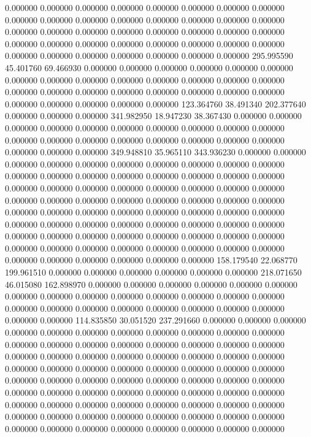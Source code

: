 0.000000 0.000000 0.000000
0.000000 0.000000 0.000000
0.000000 0.000000 0.000000
0.000000 0.000000 0.000000
0.000000 0.000000 0.000000
0.000000 0.000000 0.000000
0.000000 0.000000 0.000000
0.000000 0.000000 0.000000
0.000000 0.000000 0.000000
0.000000 0.000000 0.000000
0.000000 0.000000 0.000000
0.000000 0.000000 0.000000
0.000000 0.000000 0.000000
295.995590 45.401760 69.466930
0.000000 0.000000 0.000000
0.000000 0.000000 0.000000
0.000000 0.000000 0.000000
0.000000 0.000000 0.000000
0.000000 0.000000 0.000000
0.000000 0.000000 0.000000
0.000000 0.000000 0.000000
0.000000 0.000000 0.000000
0.000000 0.000000 0.000000
123.364760 38.491340 202.377640
0.000000 0.000000 0.000000
341.982950 18.947230 38.367430
0.000000 0.000000 0.000000
0.000000 0.000000 0.000000
0.000000 0.000000 0.000000
0.000000 0.000000 0.000000
0.000000 0.000000 0.000000
0.000000 0.000000 0.000000
0.000000 0.000000 0.000000
349.948810 35.965110 343.936230
0.000000 0.000000 0.000000
0.000000 0.000000 0.000000
0.000000 0.000000 0.000000
0.000000 0.000000 0.000000
0.000000 0.000000 0.000000
0.000000 0.000000 0.000000
0.000000 0.000000 0.000000
0.000000 0.000000 0.000000
0.000000 0.000000 0.000000
0.000000 0.000000 0.000000
0.000000 0.000000 0.000000
0.000000 0.000000 0.000000
0.000000 0.000000 0.000000
0.000000 0.000000 0.000000
0.000000 0.000000 0.000000
0.000000 0.000000 0.000000
0.000000 0.000000 0.000000
0.000000 0.000000 0.000000
0.000000 0.000000 0.000000
0.000000 0.000000 0.000000
0.000000 0.000000 0.000000
0.000000 0.000000 0.000000
0.000000 0.000000 0.000000
0.000000 0.000000 0.000000
158.179540 22.068770 199.961510
0.000000 0.000000 0.000000
0.000000 0.000000 0.000000
218.071650 46.015080 162.898970
0.000000 0.000000 0.000000
0.000000 0.000000 0.000000
0.000000 0.000000 0.000000
0.000000 0.000000 0.000000
0.000000 0.000000 0.000000
0.000000 0.000000 0.000000
0.000000 0.000000 0.000000
0.000000 0.000000 0.000000
114.835850 30.051520 237.291660
0.000000 0.000000 0.000000
0.000000 0.000000 0.000000
0.000000 0.000000 0.000000
0.000000 0.000000 0.000000
0.000000 0.000000 0.000000
0.000000 0.000000 0.000000
0.000000 0.000000 0.000000
0.000000 0.000000 0.000000
0.000000 0.000000 0.000000
0.000000 0.000000 0.000000
0.000000 0.000000 0.000000
0.000000 0.000000 0.000000
0.000000 0.000000 0.000000
0.000000 0.000000 0.000000
0.000000 0.000000 0.000000
0.000000 0.000000 0.000000
0.000000 0.000000 0.000000
0.000000 0.000000 0.000000
0.000000 0.000000 0.000000
0.000000 0.000000 0.000000
0.000000 0.000000 0.000000
0.000000 0.000000 0.000000
0.000000 0.000000 0.000000
0.000000 0.000000 0.000000
0.000000 0.000000 0.000000

